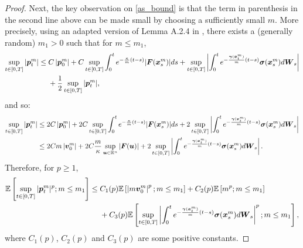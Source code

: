 \begin{proof}
Next, the key observation on \eqref{as_bound} is that the term  in parenthesis in the second line above can be made  small by choosing a sufficiently small $m$. More precisely, using an adapted version of Lemma A.2.4 in \cite{kabanov2013two}, there exists a (generally random) $m_1 > 0$ such that for $m \leq m_1$, 
\begin{align}
\sup_{t \in [0,T]} |\boldsymbol{p}_t^m| &\leq C  \left| \boldsymbol{p}_0^m\right| + C  \sup_{t \in [0,T]} \int_0^t  e^{-\frac{\kappa}{m}(t-s)} |\boldsymbol{F}(\boldsymbol{x}_s^m)| ds + \sup_{t \in [0,T]} \left| \int_0^t e^{-\frac{\boldsymbol{\gamma}(\boldsymbol{x}_t^m)}{m}(t-s)} \boldsymbol{\sigma}(\boldsymbol{x}_s^m) d\boldsymbol{W}_s \right| \nonumber \\
&\ \ \ \  + \frac{1}{2} \sup_{t \in [0,T]} |\boldsymbol{p}_t^m|, 
\end{align}
and so:
\begin{align}
\sup_{t \in [0,T]} |\boldsymbol{p}_t^m| &\leq 2C  \left| \boldsymbol{p}_0^m\right| + 2C  \sup_{t \in [0,T]} \int_0^t  e^{-\frac{\kappa}{m}(t-s)} |\boldsymbol{F}(\boldsymbol{x}_s^m)| ds + 2\sup_{t \in [0,T]} \left| \int_0^t e^{-\frac{\boldsymbol{\gamma}(\boldsymbol{x}_t^m)}{m}(t-s)} \boldsymbol{\sigma}(\boldsymbol{x}_s^m) d\boldsymbol{W}_s \right| \\ 
&\leq 2C m \left| \boldsymbol{v}_0^m\right| + 2C \frac{m}{\kappa}   \sup_{\boldsymbol{u} \in \mathbb{R}^n} |\boldsymbol{F}(\boldsymbol{u})| + 2\sup_{t \in [0,T]} \left| \int_0^t e^{-\frac{\boldsymbol{\gamma}(\boldsymbol{x}_t^m)}{m}(t-s)} \boldsymbol{\sigma}(\boldsymbol{x}_s^m) d\boldsymbol{W}_s \right|.
\end{align}
Therefore, for $p \geq 1$,
\begin{align} 
\mathbb{E}\left[\sup_{t \in [0,T]} |\boldsymbol{p}_t^m|^p; m \leq m_1 \right] &\leq C_1(p)  \mathbb{E}\left[ \left|m \boldsymbol{v}_0^m\right|^p; m \leq m_1 \right]  + C_2(p) \mathbb{E}\left[ m^p; m \leq m_1 \right] \nonumber \\ 
&\ \ \ \  + C_3(p) \mathbb{E} \left[  \sup_{t \in [0,T]} \left| \int_0^t e^{-\frac{\boldsymbol{\gamma}(\boldsymbol{x}_t^m)}{m}(t-s)} \boldsymbol{\sigma}(\boldsymbol{x}_s^m) d\boldsymbol{W}_s \right|^p; m \leq m_1 \right], \label{estt} 
\end{align}
where $C_1(p)$, $C_2(p)$ and $C_3(p)$ are some positive constants.



\end{proof}
